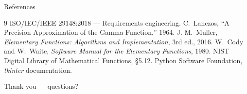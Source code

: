 \documentclass[aspectratio=169]{beamer}
\begin{document}
\begin{frame}{References}
\footnotesize
\begin{thebibliography}{9}
 ISO/IEC/IEEE 29148:2018 --- Requirements engineering.
 C.\ Lanczos, ``A Precision Approximation of the Gamma Function,'' 1964.
 J.-M.\ Muller, \emph{Elementary Functions: Algorithms and Implementation}, 3rd ed., 2016.
 W.\ Cody and W.\ Waite, \emph{Software Manual for the Elementary Functions}, 1980.
 NIST Digital Library of Mathematical Functions, \S5.12.
 Python Software Foundation, \emph{tkinter} documentation.
\end{thebibliography}
\vfill
\centering Thank you --- questions?
\end{frame}
\end{document}
